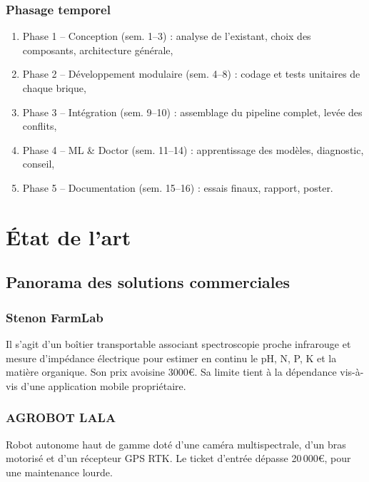 \documentclass[a4paper,12pt,openany,titlepage]{scrartcl}
\begin{document}
\subsubsection{Phasage temporel}
\begin{enumerate}[nosep]
    \item Phase 1 -- Conception (sem. 1--3) : analyse de l’existant, choix des composants, architecture générale,
    \item Phase 2 -- Développement modulaire (sem. 4--8) : codage et tests unitaires de chaque brique,
    \item Phase 3 -- Intégration (sem. 9--10) : assemblage du pipeline complet, levée des conflits,
    \item Phase 4 -- ML \& Doctor (sem. 11--14) : apprentissage des modèles, diagnostic, conseil,
    \item Phase 5 -- Documentation (sem. 15--16) : essais finaux, rapport, poster.
\end{enumerate}

\newpage

\section{\'Etat de l'art}

\subsection{Panorama des solutions commerciales}

\subsubsection{Stenon FarmLab}
Il s’agit d’un boîtier transportable associant spectroscopie proche infrarouge et mesure d’impédance électrique pour estimer en continu le pH, N, P, K et la matière organique. Son prix avoisine 3000\euro. Sa limite tient à la dépendance vis-à-vis d’une application mobile propriétaire.

\subsubsection{AGROBOT LALA}
Robot autonome haut de gamme doté d’une caméra multispectrale, d’un bras motorisé et d’un récepteur GPS RTK. Le ticket d’entrée dépasse 20\,000\euro, pour une maintenance lourde.
\end{document}
